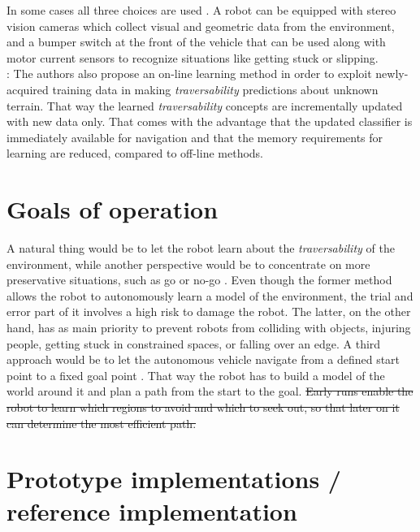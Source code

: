 \documentclass[12pt,a4paper]{report}
\newcommand{\term}{\textit}
\begin{document}
	In some cases all three choices are used \cite{Kim}. A robot can be equipped with 
	stereo vision cameras which collect visual and geometric data from the 
	environment, and a bumper switch at the front of the vehicle that can be used 
	along with motor current sensors to recognize situations like getting stuck or 
	slipping.
	\\

	

	\cite{Kim}: The authors also propose an on-line learning method in order to exploit 
	newly-acquired training data in making \term{traversability} predictions about 
	unknown terrain. That way the learned \term{traversability} concepts are 
	incrementally updated with new data only. That comes with the advantage that the 
	updated classifier is immediately available for navigation and that the 
	memory requirements for learning are reduced, compared to off-line methods.
	\\
	
	\section{Goals of operation}
	\label{sec:bg:goals}
	
	A natural thing would be to let the robot learn about the \term{traversability} 
	of the environment, while another perspective would be to concentrate on more 
	preservative situations, such as go or no-go \cite{Hirose}. Even though the 
	former method allows the robot to autonomously learn a model of the environment, 
	the trial and error part of it involves a high risk to damage the robot. The 
	latter, on the other hand, has as main priority to prevent robots from 
	colliding with objects, injuring people, getting stuck in constrained spaces, 
	or falling over an edge. A third approach would be to let the autonomous vehicle 
	navigate from a defined start point to a fixed goal	point \cite{Shneier}. That 
	way the robot has to build a model of the world around it and plan a path from 
	the start to the goal. 
	\sout{Early runs enable the robot to learn which regions to 
	avoid and which to seek out, so that later on it can determine the most efficient 
	path.}
	\\
	
	\section{Prototype implementations / reference implementation}
	\label{sec:bg:code}
	
\end{document}

